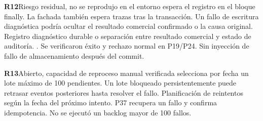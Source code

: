 \par\medskip\noindent\begin{minipage}{\linewidth}\noindent\textbf{R12}\quad\textsf{Riesgo residual, no se reprodujo en el entorno}
  espera el registro en el bloque finally. La fachada también espera trazas tras la transacción.
 Un fallo de escritura diagnóstica podría ocultar el resultado comercial confirmado o la causa original.
 Registro diagnóstico durable o separación entre resultado comercial y estado de auditoría.
 . 
 Se verificaron éxito y rechazo normal en P19/P24. Sin inyección de fallo de almacenamiento después del commit.
\end{minipage}\par
\par\medskip\noindent\begin{minipage}{\linewidth}\noindent\textbf{R13}\quad\textsf{Abierto, capacidad de reproceso manual verificada}
  selecciona por fecha un lote máximo de 100 pendientes.
 Un lote bloqueado persistentemente puede retrasar eventos posteriores hasta resolver el fallo.
 Planificación de reintentos según la fecha del próximo intento.
 
 P37 recupera un fallo y confirma idempotencia. No se ejecutó un backlog mayor de 100 fallos.
\end{minipage}\par


